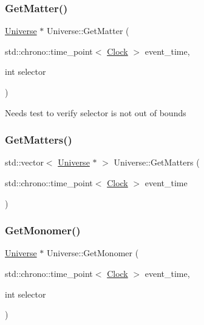 \mbox{\label{classUniverse_a69de663cf2e32e65ed28c44ae666db3a}} 
\subsubsection{\texorpdfstring{Get\+Matter()}{GetMatter()}}
{\footnotesize\ttfamily \mbox{\hyperlink{classUniverse}{Universe}} $\ast$ Universe\+::\+Get\+Matter (\begin{DoxyParamCaption}\item[{std\+::chrono\+::time\+\_\+point$<$ \mbox{\hyperlink{universe_8h_a0ef8d951d1ca5ab3cfaf7ab4c7a6fd80}{Clock}} $>$}]{event\+\_\+time,  }\item[{int}]{selector }\end{DoxyParamCaption})}

Needs test to verify selector is not out of bounds\mbox{\label{classUniverse_a4307a62e183fed8cf2b92be0f6014688}} 
\subsubsection{\texorpdfstring{Get\+Matters()}{GetMatters()}}
{\footnotesize\ttfamily std\+::vector$<$ \mbox{\hyperlink{classUniverse}{Universe}} $\ast$ $>$ Universe\+::\+Get\+Matters (\begin{DoxyParamCaption}\item[{std\+::chrono\+::time\+\_\+point$<$ \mbox{\hyperlink{universe_8h_a0ef8d951d1ca5ab3cfaf7ab4c7a6fd80}{Clock}} $>$}]{event\+\_\+time }\end{DoxyParamCaption})}

\mbox{\label{classUniverse_aaa03fb8178d790afd992dd094bb64b47}} 
\subsubsection{\texorpdfstring{Get\+Monomer()}{GetMonomer()}}
{\footnotesize\ttfamily \mbox{\hyperlink{classUniverse}{Universe}} $\ast$ Universe\+::\+Get\+Monomer (\begin{DoxyParamCaption}\item[{std\+::chrono\+::time\+\_\+point$<$ \mbox{\hyperlink{universe_8h_a0ef8d951d1ca5ab3cfaf7ab4c7a6fd80}{Clock}} $>$}]{event\+\_\+time,  }\item[{int}]{selector }\end{DoxyParamCaption})}

